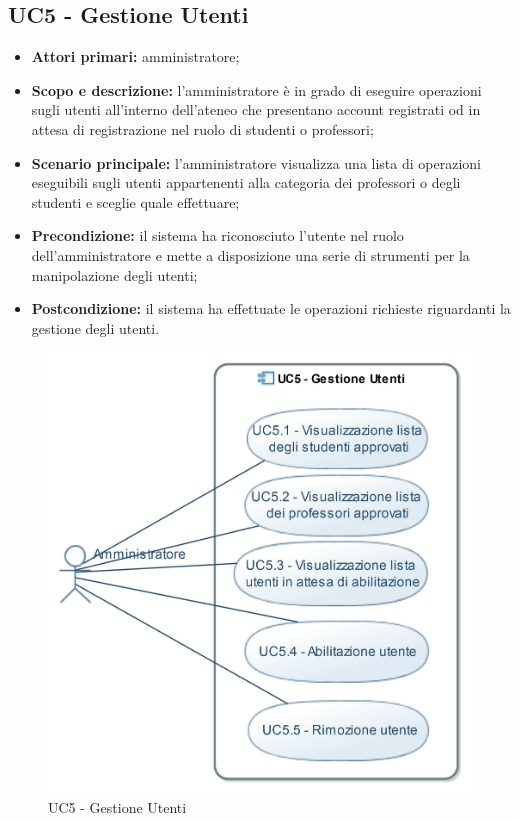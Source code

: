 \documentclass[AnalisiDeiRequisiti.tex]{subfiles}
\begin{document}
\subsection{UC5 - Gestione Utenti}
\begin{itemize}
	\item \textbf{Attori primari:} amministratore;
	\item \textbf{Scopo e descrizione:} l'amministratore è in grado di eseguire operazioni sugli utenti all'interno dell'ateneo che presentano account registrati od in attesa di registrazione nel ruolo di studenti o professori;
	\item \textbf{Scenario principale:} l'amministratore visualizza una lista di operazioni eseguibili sugli utenti appartenenti alla categoria dei professori o degli studenti e sceglie quale effettuare;
	\item \textbf{Precondizione:} il sistema ha riconosciuto l'utente nel ruolo dell'amministratore e mette a disposizione una serie di strumenti per la manipolazione degli utenti; 
	\item \textbf{Postcondizione:} il sistema ha effettuate le operazioni richieste riguardanti la gestione degli utenti.
\end{itemize}

\begin{figure}[H]
	\centering
	\includegraphics[width=0.8\linewidth]{UC5.jpg}
	\caption{UC5 - Gestione Utenti}
	\label{fig:UC5 - Gestione Utenti}
\end{figure}
\end{document}
